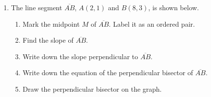 \documentclass[12pt, twoside]{article}
\begin{document}
\begin{enumerate}
\item The line segment $\overline{AB}$, $A(2,1)$ and $B(8,3)$, is shown below.
  \begin{multicols}{2}
    \begin{enumerate}
    \item Mark the midpoint $M$ of $\overline{AB}$. Label it as an ordered pair.
    \item Find the slope of $\overline{AB}$. \vspace{2cm}
    \item Write down the slope perpendicular to $\overline{AB}$. \vspace{1cm}
    \item Write down the equation of the perpendicular bisector of $\overline{AB}$. \vspace{2cm}
    \item Draw the perpendicular bisector on the graph.
  \end{enumerate} \vspace{1cm}  
  \begin{center} %
    \end{center} 
  \end{multicols}




  
\end{enumerate}
\end{document}
